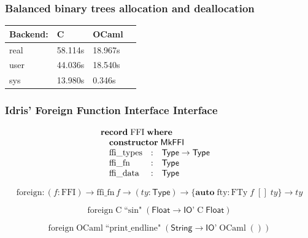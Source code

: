\documentclass[aspectratio=169]{beamer}
\begin{document}
\begin{frame}
  \frametitle{Balanced binary trees allocation and deallocation}
  \centering
  \begin{tabular}{l|lll}
    Backend: & C       & OCaml   & \\
    \hline
    real & 58.114s & 18.967s & \\
    user & 44.036s & 18.540s & \\
    sys  & 13.980s & 0.346s  &
  \end{tabular}
\end{frame}


\begin{frame}[t]
  \frametitle{Idris' Foreign Function Interface Interface}

  \begin{displaymath}
    \begin{array}{@{}l}
      \textbf{record}\;\mathrm{FFI}\;\textbf{where} \\
      \quad \textbf{constructor}\;\textsf{MkFFI} \\
      \quad
      \begin{array}{@{}lcl}
        \mathrm{ffi\_types}&:&\textsf{Type} \to \textsf{Type} \\
        \mathrm{ffi\_fn}&:&\textsf{Type} \\
        \mathrm{ffi\_data}&:&\textsf{Type}
      \end{array}
    \end{array}
  \end{displaymath}

  \bigskip
  \pause

  \begin{displaymath}
    \mathrm{foreign} : (f : \mathrm{FFI}) \to \mathrm{ffi\_fn}\,f \to (\mathit{ty} : \textsf{Type}) \to \{\textbf{auto}\;\mathrm{fty} : \mathrm{FTy}\;f\;[]\;\mathit{ty}\} \to \mathit{ty}
  \end{displaymath}

  \bigskip
  \pause

  \begin{displaymath}
    \mathrm{foreign}\;\mathrm{C}\;\textrm{``sin"}\;(\textsf{Float} \to \textsf{IO'}\;\mathrm{C}\;\textsf{Float})
  \end{displaymath}

  \pause

  \begin{displaymath}
    \mathrm{foreign}\;\mathrm{OCaml}\;\textrm{``print\_endline"}\;(\textsf{String} \to \textsf{IO'}\;\mathrm{OCaml}\;())
  \end{displaymath}
\end{frame}
\end{document}
